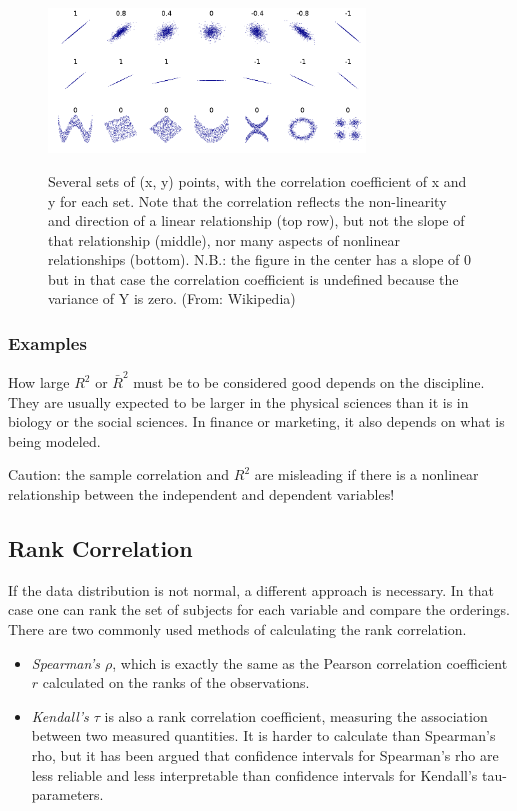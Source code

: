\begin{figure}
  \centering
  \includegraphics[width=0.75\textwidth]{../Images/Correlation_examples2.png}\\
  \caption{Several sets of (x, y) points, with the correlation coefficient of x and y for each set. Note that the correlation reflects the non-linearity and direction of a linear relationship (top row), but not the slope of that relationship (middle), nor many aspects of nonlinear relationships (bottom). N.B.: the figure in the center has a slope of 0 but in that case the correlation coefficient is undefined because the variance of Y is zero. (From: Wikipedia)}\label{fig:correlation}
\end{figure}

\subsubsection{Examples}

How large $R^2$ or $\bar{R}^2$ must be to be considered good depends on the discipline. They are usually expected to be larger in the physical sciences than it is in biology or the social sciences. In finance or marketing, it also depends on what is being modeled.

Caution: the sample correlation and $R^2$ are misleading if there is a nonlinear relationship between the independent and dependent variables!

\subsection{Rank Correlation}

If the data distribution is not normal, a different approach is necessary. In that case one can rank the set of subjects for each variable and compare the orderings. There are two commonly used methods of calculating the rank correlation. 

\begin{itemize}
  \item   \emph{Spearman's $\rho$}, which is exactly the same as the Pearson correlation coefficient $r$ calculated on the ranks of the observations.
  \item   \emph{Kendall's $\tau$} is also a rank correlation coefficient, measuring the association between two measured quantities. It is harder to calculate than Spearman's rho, but it has been argued that confidence intervals for Spearman’s rho are less reliable and less interpretable than confidence intervals for Kendall’s tau-parameters.
\end{itemize}

